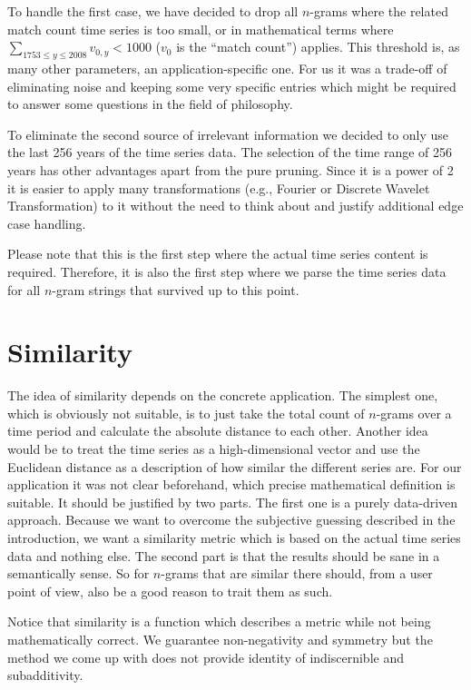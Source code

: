 To handle the first case, we have decided to drop all $n$-grams where the related match count time series is too small, or in mathematical terms where $\sum_{1753 \leq y \leq 2008} v_{0, y} < 1000$ ($v_0$ is the \enquote{match count}) applies. This threshold is, as many other parameters, an application-specific one. For us it was a trade-off of eliminating noise and keeping some very specific entries which might be required to answer some questions in the field of philosophy.

To eliminate the second source of irrelevant information we decided to only use the last \num{256} years of the time series data. The selection of the time range of \num{256} years has other advantages apart from the pure pruning. Since it is a power of \num{2} it is easier to apply many transformations (e.g., Fourier or Discrete Wavelet Transformation) to it without the need to think about and justify additional edge case handling.

Please note that this is the first step where the actual time series content is required. Therefore, it is also the first step where we parse the time series data for all $n$-gram strings that survived up to this point.


\section{Similarity}
\label{sec:baseline:sim}
The idea of similarity depends on the concrete application. The simplest one, which is obviously not suitable, is to just take the total count of $n$-grams over a time period and calculate the absolute distance to each other. Another idea would be to treat the time series as a high-dimensional vector and use the Euclidean distance as a description of how similar the different series are. For our application it was not clear beforehand, which precise mathematical definition is suitable. It should be justified by two parts. The first one is a purely data-driven approach. Because we want to overcome the subjective guessing described in the introduction, we want a similarity metric which is based on the actual time series data and nothing else. The second part is that the results should be sane in a semantically sense. So for $n$-grams that are similar there should, from a user point of view, also be a good reason to trait them as such.

Notice that similarity is a function which describes a metric while not being mathematically correct. We guarantee non-negativity and symmetry but the method we come up with does not provide identity of indiscernible and subadditivity.

